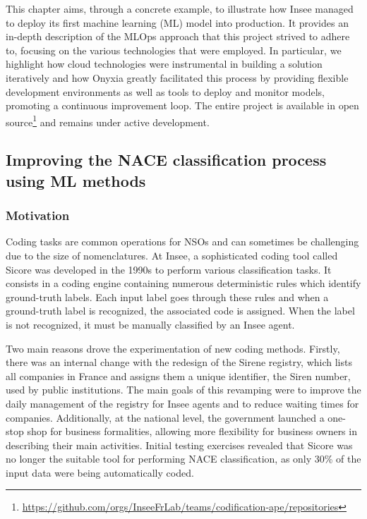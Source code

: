 \documentclass[graybox]{svmult}
\begin{document}
This chapter aims, through a concrete example, to illustrate how Insee managed to deploy its first machine learning (ML) model into production. It provides an in-depth description of the MLOps approach that this project strived to adhere to, focusing on the various technologies that were employed. In particular, we highlight how cloud technologies were instrumental in building a solution iteratively and how Onyxia greatly facilitated this process by providing flexible development environments as well as tools to deploy and monitor models, promoting a continuous improvement loop. The entire project is available in open source\footnote{\url{https://github.com/orgs/InseeFrLab/teams/codification-ape/repositories}} and remains under active development.






\subsection{Improving the NACE classification process using ML methods}

\subsubsection{Motivation}

Coding tasks are common operations for NSOs and can sometimes be challenging due to the size of nomenclatures. At Insee, a sophisticated coding tool called Sicore was developed in the 1990s to perform various classification tasks. It consists in a coding engine containing numerous deterministic rules which identify ground-truth labels. Each input label goes through these rules and when a ground-truth label is recognized, the associated code is assigned. When the label is not recognized, it must be manually classified by an Insee agent. 

Two main reasons drove the experimentation of new coding methods. Firstly, there was an internal change with the redesign of the Sirene registry, which lists all companies in France and assigns them a unique identifier, the Siren number, used by public institutions. The main goals of this revamping were to improve the daily management of the registry for Insee agents and to reduce waiting times for companies. Additionally, at the national level, the government launched a one-stop shop for business formalities, allowing more flexibility for business owners in describing their main activities. Initial testing exercises revealed that Sicore was no longer the suitable tool for performing NACE classification, as only 30\% of the input data were being automatically coded.
\end{document}
